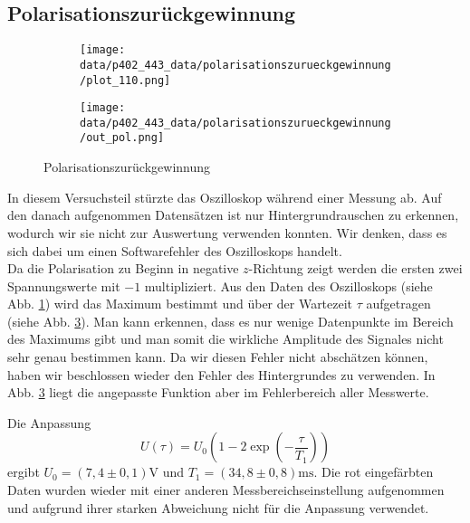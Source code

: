 \subsection{Polarisationszurückgewinnung}
\begin{figure}[h]
  \begin{subfigure}[h]{0.5\textwidth}
    \centering
    \texttt{[image: data/p402\_443\_data/polarisationszurueckgewinnung/plot\_110.png]}
    \label{fig:pol_bsp}
  \end{subfigure}%
  \begin{subfigure}[h]{0.5\textwidth}
    \centering
    \texttt{[image: data/p402\_443\_data/polarisationszurueckgewinnung/out\_pol.png]}
    \label{fig:pol_data}
  \end{subfigure}
  \caption{Polarisationszurückgewinnung}
\end{figure}
In diesem Versuchsteil stürzte das Oszilloskop während einer Messung ab. Auf den danach aufgenommen Datensätzen ist nur Hintergrundrauschen zu erkennen, wodurch wir sie nicht zur Auswertung verwenden konnten. Wir denken, dass es sich dabei um einen Softwarefehler des Oszilloskops handelt.\\

Da die Polarisation zu Beginn in negative $z$-Richtung zeigt werden die ersten zwei Spannungswerte mit $-1$ multipliziert.  
Aus den Daten des Oszilloskops (siehe Abb. \ref{fig:pol_bsp}) wird das Maximum bestimmt und über der Wartezeit $\tau$ aufgetragen (siehe Abb. \ref{fig:pol_data}). Man kann erkennen, dass es nur wenige Datenpunkte im Bereich des Maximums gibt und man somit die wirkliche Amplitude des Signales nicht sehr genau bestimmen kann. Da wir diesen Fehler nicht abschätzen können, haben wir beschlossen wieder den Fehler des Hintergrundes zu verwenden. In Abb. \ref{fig:pol_data} liegt die angepasste Funktion aber im Fehlerbereich aller Messwerte.

Die Anpassung $$U(\tau) = U_0\left(1-2\exp{\left(-\frac{\tau}{T_1}\right)}\right)$$ ergibt $U_0 = (7,4\pm 0,1)\si{\volt}$ und $T_1 = (34,8\pm 0,8) \si{\milli\second}$. Die rot eingefärbten Daten wurden wieder mit einer anderen Messbereichseinstellung aufgenommen und aufgrund ihrer starken Abweichung nicht für die Anpassung verwendet.\\

